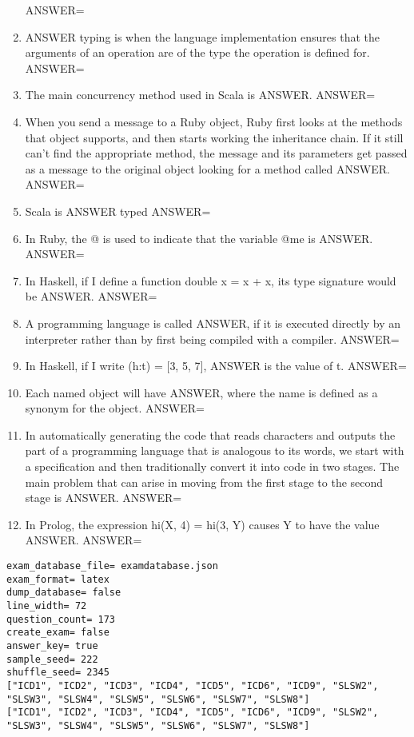 \documentclass{exam}
\begin{document}
\begin{enumerate}
ANSWER=
\item ANSWER typing is when the language implementation ensures that the arguments of an operation are of the type the operation is defined for.\newline
ANSWER=
\item The main concurrency method used in Scala is ANSWER.\newline
ANSWER=
\item When you send a message to a Ruby object, Ruby first looks at the methods that object supports, and then starts working the inheritance chain.  If it still can't find the appropriate method, the message and its parameters get passed as a message to the original object looking for a method called ANSWER.\newline
ANSWER=
\item Scala is ANSWER typed\newline
ANSWER=
\item In Ruby, the @ is used to indicate that the variable @me is ANSWER.\newline
ANSWER=
\item In Haskell, if I define a function double x = x + x, its type signature would be ANSWER.\newline
ANSWER=
\item A programming language is called ANSWER, if it is executed directly by an interpreter rather than by first being compiled with a compiler.\newline
ANSWER=
\item In Haskell, if I write (h:t) = $\lbrack$3, 5, 7$\rbrack$, ANSWER is the value of t.\newline
ANSWER=
\item Each named object will have ANSWER, where the name is defined as a synonym for the object.\newline
ANSWER=
\item In automatically generating the code that reads characters and outputs the part of a programming language that is analogous to its words, we start with a specification and then traditionally convert it into code in two stages.  The main problem that can arise in moving from the first stage to the second stage is ANSWER.\newline
ANSWER=
\item In Prolog, the expression hi(X, 4) = hi(3, Y) causes Y to have the value ANSWER.\newline
ANSWER=
\end{enumerate}
\newpage
\begin{verbatim}
exam_database_file= examdatabase.json
exam_format= latex
dump_database= false
line_width= 72
question_count= 173
create_exam= false
answer_key= true
sample_seed= 222
shuffle_seed= 2345
["ICD1", "ICD2", "ICD3", "ICD4", "ICD5", "ICD6", "ICD9", "SLSW2",
"SLSW3", "SLSW4", "SLSW5", "SLSW6", "SLSW7", "SLSW8"]
["ICD1", "ICD2", "ICD3", "ICD4", "ICD5", "ICD6", "ICD9", "SLSW2",
"SLSW3", "SLSW4", "SLSW5", "SLSW6", "SLSW7", "SLSW8"]
\end{verbatim}
\end{document}
